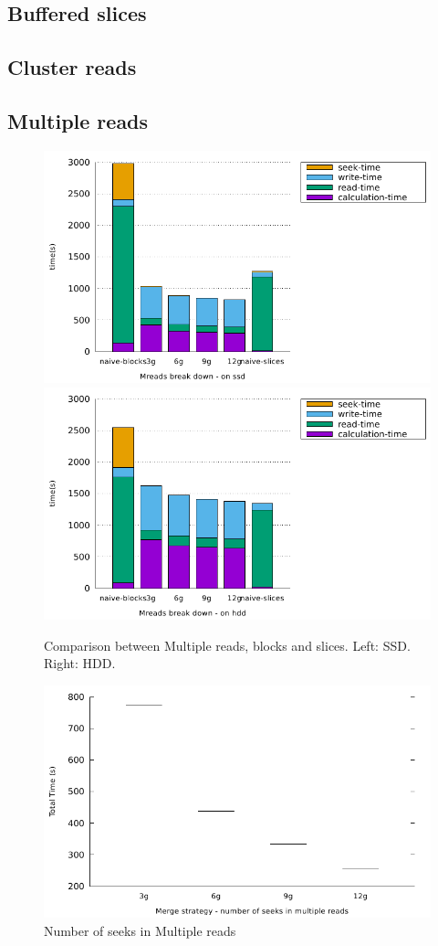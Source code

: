 \documentclass[10pt, conference, compsocconf]{IEEEtran}
\begin{document}
\subsection{Buffered slices}

\subsection{Cluster reads}

\subsection{Multiple reads}

\begin{figure}[h]
  \centering
  \includegraphics[width=0.45\columnwidth]{figures/benchmark-mreads/mreads-breakdown-ssd.pdf}
  \hfill
    \includegraphics[width=0.45\columnwidth]{figures/benchmark-mreads/mreads-breakdown-hdd.pdf}
  \caption{Comparison between Multiple reads, blocks and slices. Left: SSD. Right: HDD.}
\label{fig:multiple-reads}
\end{figure}

\begin{figure}[h]
  \centering
  \includegraphics[width=0.70\columnwidth]{figures/benchmark-mreads/mreads-number-of-seeks.pdf}
  \hfill
  \caption{Number of seeks in Multiple reads}
\label{fig:multiple-reads-number-of-seek}
\end{figure}
\end{document}
